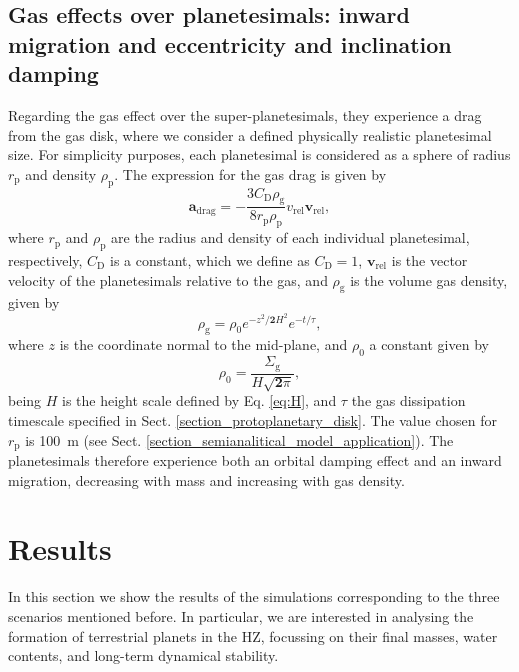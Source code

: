 \documentclass{aa}
\begin{document}
\subsection{Gas effects over planetesimals: inward migration and eccentricity and inclination damping}
\label{section_nbody_gas_drag}

Regarding the gas effect over the super-planetesimals, they experience a drag from the gas disk, where we consider a defined physically
realistic planetesimal size. For simplicity purposes, each planetesimal is considered as a sphere of radius $r_{\text{p}}$ and density $\rho_{\text{p}}$.
The expression for the gas drag is given by
\begin{equation}
  \mathbf{a}_{\text{drag}} = -\frac{3 C_{\text{D}} \rho_{\text{g}}}{8 r_{\text{p}} \rho_{\text{p}}} v_{\text{rel}} \mathbf{v}_{\text{rel}},
\end{equation}
\noindent
\citep{Adachi1976} where $r_{\text{p}}$ and $\rho_{\text{p}}$ are the radius and density of each individual planetesimal, respectively, $C_{\text{D}}$ is
a constant, which we define as $C_{\text{D}}=1$, $\mathbf{v}_{\text{rel}}$ is the vector velocity of the planetesimals relative to the gas, and $\rho_{\text{g}}$
is the volume gas density, given by
\begin{equation}
 \rho_{\text{g}} = \rho_0 e^{-{z^2/\mathbf{2}H^2}} e^{-t/\tau},
\end{equation}
\noindent
where $z$ is the coordinate normal to the mid-plane, and $\rho_0$ a constant given by
\begin{equation}
 \rho_0 = \frac{\Sigma_{\text{g}}}{H\sqrt{\mathbf{2}\pi}},
\end{equation}
\noindent
being $H$ is the height scale defined by Eq. \eqref{eq:H}, and $\tau$ the gas dissipation timescale specified in
Sect. \ref{section_protoplanetary_disk}. The value chosen for $r_{\text{p}}$ is 100~m (see Sect. \ref{section_semianalitical_model_application}). The planetesimals therefore experience both an orbital damping effect and an inward migration, decreasing with mass and increasing
with gas density.

\section{Results}

In this section we show the results of the simulations corresponding to the three scenarios mentioned before. In particular, we are
interested in analysing the formation of terrestrial planets in the HZ, focussing on their final masses, water contents, and long-term
dynamical stability.
\end{document}
